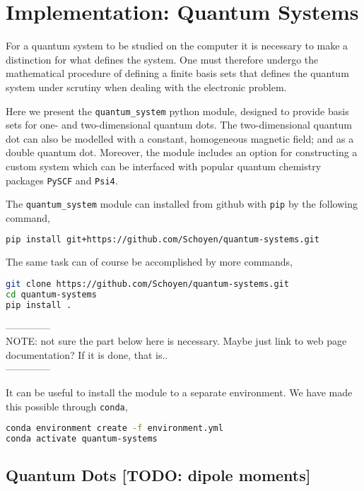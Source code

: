 \chapter{Implementation: Quantum Systems}

For a quantum system to be studied on the computer it is necessary to 
make a distinction for what defines the system. One must therefore undergo the
mathematical procedure of defining a finite basis sets that defines the 
quantum system under scrutiny when dealing with the electronic problem. 

Here we present the \lstinline{quantum_system} python module, designed to 
provide basis sets for one- and two-dimensional quantum dots. The two-dimensional 
quantum dot can also be modelled with a constant, homogeneous magnetic field; and 
as a double quantum dot. 
Moreover, the module includes an option for constructing a custom system which can 
be interfaced with popular quantum chemistry packages \lstinline{PySCF}\cite{PYSCF} 
and \lstinline{Psi4}\cite{parrish2017psi4}.

The \lstinline{quantum_system} module can installed from github with \lstinline{pip}
by the following command,
\begin{lstlisting}[language=bash]
pip install git+https://github.com/Schoyen/quantum-systems.git
\end{lstlisting}
The same task can of course be accomplished by more commands,
\begin{lstlisting}[language=bash]
git clone https://github.com/Schoyen/quantum-systems.git
cd quantum-systems
pip install .
\end{lstlisting}

\noindent
--------------\\
NOTE: not sure the part below here is necessary. Maybe just link to web page 
documentation? If it is done, that is.. \\
--------------

It can be useful to install the module to a separate environment. We have made this 
possible through \lstinline{conda},
\begin{lstlisting}[language=bash]
conda environment create -f environment.yml
conda activate quantum-systems    
\end{lstlisting}

\section{Quantum Dots [TODO: dipole moments]}

